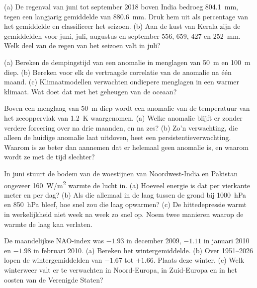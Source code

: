 \begin{exercise}[$\star$]\label{exo:b2:climate-variability:4}
(a) De regenval van juni tot september 2018 boven India bedroeg \qty{804.1}{mm}, tegen een
langjarig gemiddelde van \qty{880.6}{mm}. Druk hem uit als percentage van het gemiddelde en classificeer
het seizoen. (b) Aan de kust van Kerala zijn de gemiddelden voor juni, juli, augustus en september 556,
659, 427 en \qty{252}{mm}. Welk deel van de regen van het seizoen valt in juli?
\end{exercise}

\begin{exercise}[$\star\star$]\label{exo:b2:climate-variability:5}
(a) Bereken de dempingstijd van een anomalie in menglagen van \qty{50}{m} en \qty{100}{m} diep.
(b) Bereken voor elk de vertraagde correlatie van de anomalie na één maand. (c) Klimaatmodellen
verwachten ondiepere menglagen in een warmer klimaat. Wat doet dat met het geheugen van de
oceaan?
\end{exercise}

\begin{exercise}[$\star\star$]\label{exo:b2:climate-variability:6}
Boven een menglaag van \qty{50}{m} diep wordt een anomalie van de temperatuur van het zeeoppervlak van \qty{+1.2}{K}
waargenomen. (a) Welke anomalie blijft er zonder verdere forcering over na drie maanden, en na zes? (b)
Zo'n verwachting, die alleen de huidige anomalie laat uitdoven, heet een persistentieverwachting.
Waarom is ze beter dan aannemen dat er helemaal geen anomalie is, en waarom wordt ze met de tijd slechter?
\end{exercise}

\begin{exercise}[$\star\star$]\label{exo:b2:climate-variability:7}
In juni stuurt de bodem van de woestijnen van Noordwest-India en Pakistan ongeveer
\qty{160}{W/m^2} warmte de lucht in. (a) Hoeveel energie is dat per vierkante meter en per dag?
(b) Als die allemaal in de laag tussen de grond bij \qty{1000}{hPa} en \qty{850}{hPa} bleef, hoe
snel zou die laag opwarmen? (c) De hittedepressie warmt in werkelijkheid niet week na week zo snel op.
Noem twee manieren waarop de warmte de laag kan verlaten.
\end{exercise}

\begin{exercise}[$\star\star$]\label{exo:b2:climate-variability:8}
De maandelijkse NAO-index was $-1.93$ in december 2009, $-1.11$ in januari 2010 en $-1.98$ in
februari 2010. (a) Bereken het wintergemiddelde. (b) Over 1951--2026 lopen de wintergemiddelden van
$-1.67$ tot $+1.66$. Plaats deze winter. (c) Welk winterweer valt er te verwachten in Noord-Europa,
in Zuid-Europa en in het oosten van de Verenigde Staten?
\end{exercise}

